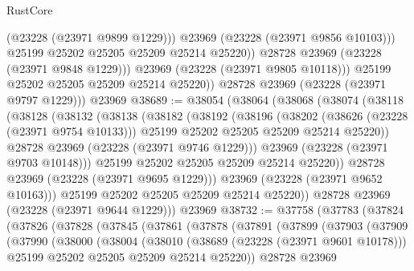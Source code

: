 \begin{lexlean}{RustCore}
\begin{coremodule}
                      (@23228 (@23971 @9899 @1229)))
                    @23969
                    (@23228 (@23971 @9856 @10103)))
                  @25199
                  @25202
                  @25205
                  @25209
                  @25214
                  @25220))
              @28728
              @23969
              (@23228 (@23971 @9848 @1229)))
            @23969
            (@23228 (@23971 @9805 @10118)))
          @25199
          @25202
          @25205
          @25209
          @25214
          @25220))
      @28728
      @23969
      (@23228 (@23971 @9797 @1229)))
    @23969
@38689 := @38054
    (@38064
      (@38068
        (@38074
          (@38118
            (@38128
              (@38132
                (@38138
                  (@38182
                    (@38192
                      (@38196
                        (@38202
                          (@38626 (@23228 (@23971 @9754 @10133)))
                          @25199
                          @25202
                          @25205
                          @25209
                          @25214
                          @25220))
                      @28728
                      @23969
                      (@23228 (@23971 @9746 @1229)))
                    @23969
                    (@23228 (@23971 @9703 @10148)))
                  @25199
                  @25202
                  @25205
                  @25209
                  @25214
                  @25220))
              @28728
              @23969
              (@23228 (@23971 @9695 @1229)))
            @23969
            (@23228 (@23971 @9652 @10163)))
          @25199
          @25202
          @25205
          @25209
          @25214
          @25220))
      @28728
      @23969
      (@23228 (@23971 @9644 @1229)))
    @23969
@38732 := @37758
    (@37783
      (@37824
        (@37826
          (@37828
            (@37845
              (@37861
                (@37878
                  (@37891
                    (@37899
                      (@37903
                        (@37909
                          (@37990
                            (@38000
                              (@38004
                                (@38010
                                  (@38689 (@23228 (@23971 @9601 @10178)))
                                  @25199
                                  @25202
                                  @25205
                                  @25209
                                  @25214
                                  @25220))
                              @28728
                              @23969

\end{coremodule}
\end{lexlean}
